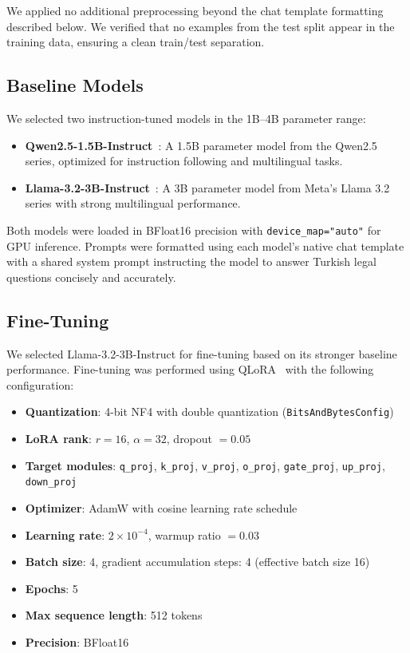 \documentclass[conference]{IEEEtran}
\begin{document}
We applied no additional preprocessing beyond the chat template formatting described below.
We verified that no examples from the test split appear in the training data, ensuring a
clean train/test separation.

\subsection{Baseline Models}

We selected two instruction-tuned models in the 1B--4B parameter range:

\begin{itemize}
  \item \textbf{Qwen2.5-1.5B-Instruct}~\cite{bai2023qwen}: A 1.5B parameter model from
    the Qwen2.5 series, optimized for instruction following and multilingual tasks.
  \item \textbf{Llama-3.2-3B-Instruct}~\cite{touvron2023llama}: A 3B parameter model
    from Meta's Llama 3.2 series with strong multilingual performance.
\end{itemize}

Both models were loaded in BFloat16 precision with \texttt{device\_map="auto"} for GPU
inference. Prompts were formatted using each model's native chat template with a shared
system prompt instructing the model to answer Turkish legal questions concisely and
accurately.

\subsection{Fine-Tuning}

We selected Llama-3.2-3B-Instruct for fine-tuning based on its stronger baseline
performance. Fine-tuning was performed using QLoRA~\cite{dettmers2023qlora} with the
following configuration:

\begin{itemize}
  \item \textbf{Quantization}: 4-bit NF4 with double quantization
    (\texttt{BitsAndBytesConfig})
  \item \textbf{LoRA rank}: $r = 16$, $\alpha = 32$, dropout $= 0.05$
  \item \textbf{Target modules}: \texttt{q\_proj}, \texttt{k\_proj}, \texttt{v\_proj},
    \texttt{o\_proj}, \texttt{gate\_proj}, \texttt{up\_proj}, \texttt{down\_proj}
  \item \textbf{Optimizer}: AdamW with cosine learning rate schedule
  \item \textbf{Learning rate}: $2 \times 10^{-4}$, warmup ratio $= 0.03$
  \item \textbf{Batch size}: 4, gradient accumulation steps: 4 (effective batch size 16)
  \item \textbf{Epochs}: 5
  \item \textbf{Max sequence length}: 512 tokens
  \item \textbf{Precision}: BFloat16
\end{itemize}
\end{document}
